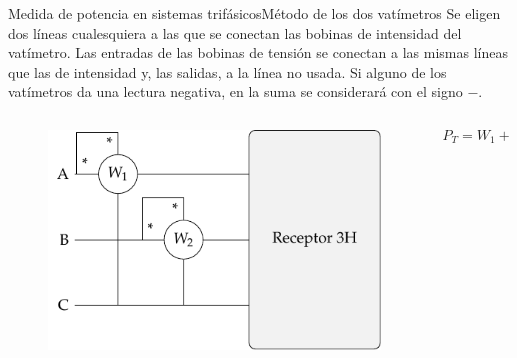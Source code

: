 \documentclass[aspectratio=169, xcolor={usenames,svgnames,dvipsnames}]{beamer}
\begin{document}
\begin{frame}{Medida de potencia en sistemas trifásicos}{Método de los dos vatímetros}
Se eligen \alert{dos líneas cualesquiera} a las que se conectan las \alert{bobinas de intensidad} del vatímetro. Las \alert{entradas de las bobinas de tensión} se conectan a las \alert{mismas líneas} que las de intensidad y, las \alert{salidas}, a la \alert{línea no usada}. Si alguno de los vatímetros da una lectura negativa, en la suma se considerará con el signo $-$.  
\begin{columns}
\begin{column}{0.6\linewidth}
\begin{figure}[H]
	    \centering
	    \includegraphics{../figs/Potencia3H.pdf}
	\end{figure}
\end{column}
\begin{column}{0.4\linewidth}
\begin{equation*}
    P_T=W_1+W_2
\end{equation*}
\end{column}
\end{columns}
\end{frame}
\end{document}
